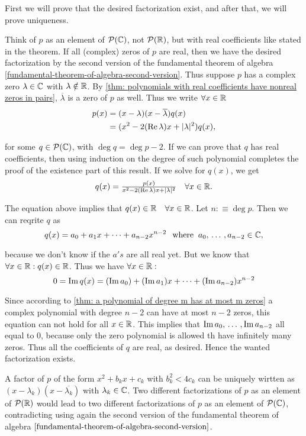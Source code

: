\begin{prf}
  First we will prove that the desired factorization exist, and after that, we will prove uniqueness.

  Think of $p$ as an element of $\mathcal{P}(\mathbb{C})$, not $\mathcal{P}(\mathbb{R})$, but with real coefficients like stated in the theorem. If all (complex) zeros of $p$ are real, then we have the desired factorization by the second version of the fundamental theorem of algebra \ref{fundamental-theorem-of-algebra-second-version}. Thus suppose $p$ has a complex zero $\lambda \in \mathbb{C}$ with $\lambda \notin \mathbb{R}$. By \ref{thm: polynomials with real coefficients have nonreal zeros in pairs}, $\overline \lambda$ is a zero of $p$ as well. Thus we write $\forall x \in \mathbb{R}$
  \[
  \begin{aligned}
    p(x)
    &= (x - \lambda) (x-\overline \lambda) q(x) \\
    &= (x^2 - 2 (\operatorname{Re}  \lambda)x +  |\lambda|^2) q(x),  \\
  \end{aligned}
  \]

  for some $q \in \mathcal{P}(\mathbb{C})$, with $\deg q = \deg p -2$. If we can prove that $q$ has real coefficients, then using induction on the degree of such polynomial completes the proof of the existence part of this result. If we solve for $q(x)$, we get
  \[
    q(x) = \tfrac{p(x)}{x^2 - 2(\operatorname{Re} \lambda) x  + |\lambda|^2} \quad \forall x \in \mathbb{R}.
  \]

  The equation above implies that $q(x) \in \mathbb{R} \quad \forall x \in \mathbb{R}$. Let $n :\equiv \deg p$. Then we can reqrite $q$ as
  \[
    q(x) = a_0 + a_1 x + \cdots + a_{n-2} x^{n-2} \;\;\, \text{where}\;\; a_0, {\, \ldots \,\,}, a_{n-2} \in \mathbb{C},
  \]

  because we don't know if the $a's$ are all real yet. But we know that $\forall x \in \mathbb{R}: q(x) \in \mathbb{R}$. Thus we have $\forall x \in \mathbb{R}:$
  \[
    0 = \operatorname{Im} q(x) = (\operatorname{Im} a_0) + (\operatorname{Im} a_1)x + \cdots + (\operatorname{Im} a_{n-2})x^{n-2}
  \]

  Since according to \ref{thm: a polynomial of degree m has at most m zeros} a complex polynomial with degree $n-2$ can have at most $n-2$ zeros, this equation can not hold for all $x \in \mathbb{R}$. This implies that $\operatorname{Im} a_0, {\, \ldots \,\,}, \operatorname{Im} a_{n-2}$ all equal to $0$, because only the zero polynomial is allowed th have infinitely many zeros. Thus all the coefficients of $q$ are real, as desired. Hence the wanted factorization exists.

   A factor of $p$ of the form $x^2 + b_kx + c_k$ with $b_k^2 < 4c_k$ can be uniquely wirtten as $(x-\lambda_k)(x-\overline{\lambda_k})$ with $\lambda_k \in \mathbb{C}$. Two different factorizations of $p$ as an element of $\mathcal{P}(\mathbb{R})$ would lead to two different factorizations of $p$ as an element of $\mathcal{P}(\mathbb{C})$, contradicting using again the second version of the fundamental theorem of algebra $\ref{fundamental-theorem-of-algebra-second-version}$.
\end{prf}

